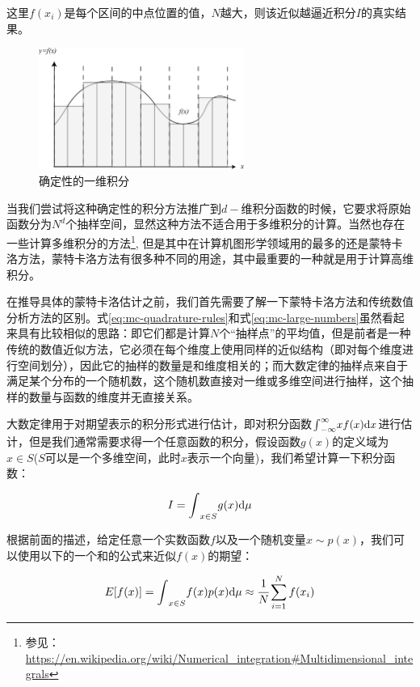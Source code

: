 \noindent 这里$f(x_i)$是每个区间的中点位置的值，$N$越大，则该近似越逼近积分$I$的真实结果。

\begin{figure}
\sidecaption
	\includegraphics[width=0.6\textwidth]{figures/mc/mc-1}
	\caption{确定性的一维积分}
	\label{f:mc-quadrature-rules}
\end{figure} 

当我们尝试将这种确定性的积分方法推广到$d-$维积分函数的时候，它要求将原始函数分为$N^d$个抽样空间，显然这种方法不适合用于多维积分的计算。当然也存在一些计算多维积分的方法\footnote{参见：\url{https://en.wikipedia.org/wiki/Numerical_integration\#Multidimensional\_integrals}}, 但是其中在计算机图形学领域用的最多的还是蒙特卡洛方法，蒙特卡洛方法有很多种不同的用途，其中最重要的一种就是用于计算高维积分。

在推导具体的蒙特卡洛估计之前，我们首先需要了解一下蒙特卡洛方法和传统数值分析方法的区别。式\ref{eq:mc-quadrature-rules}和式\ref{eq:mc-large-numbers}虽然看起来具有比较相似的思路：即它们都是计算$N$个“抽样点”的平均值，但是前者是一种传统的数值近似方法，它必须在每个维度上使用同样的近似结构（即对每个维度进行空间划分），因此它的抽样的数量是和维度相关的；而大数定律的抽样点来自于满足某个分布的一个随机数，这个随机数直接对一维或多维空间进行抽样，这个抽样的数量与函数的维度并无直接关系。

大数定律用于对期望表示的积分形式进行估计，即对积分函数${\rm \int}_{-\infty}^{\infty}xf(x){\rm d}x$进行估计，但是我们通常需要求得一个任意函数的积分，假设函数$g(x)$的定义域为$x\in S$($S$可以是一个多维空间，此时$x$表示一个向量)，我们希望计算一下积分函数：

\begin{equation}
	I={\rm \int}_{x\in S}g(x){\rm d}\mu
\end{equation}

\noindent 根据前面的描述，给定任意一个实数函数$f$以及一个随机变量$x\sim p(x)$，我们可以使用以下的一个和的公式来近似$f(x)$的期望：

\begin{equation}\label{e:sum}
	E[f(x)]={\rm \int}_{x\in S}f(x)p(x){\rm d}\mu\approx \cfrac{1}{N}\sum_{i=1}^{N}f(x_i)
\end{equation}

